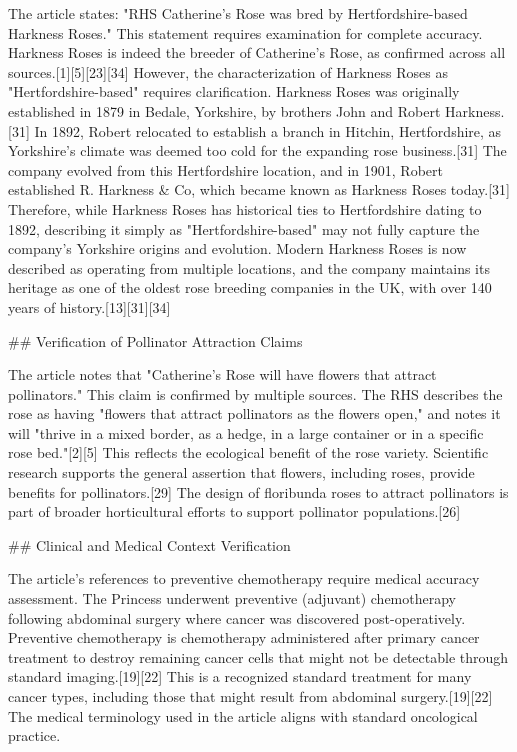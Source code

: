 \documentclass[10pt,a4paper]{article}
\begin{document}
The article states: "RHS Catherine's Rose was bred by Hertfordshire-based Harkness Roses." This statement requires examination for complete accuracy. Harkness Roses is indeed the breeder of Catherine's Rose, as confirmed across all sources.[1][5][23][34] However, the characterization of Harkness Roses as "Hertfordshire-based" requires clarification. Harkness Roses was originally established in 1879 in Bedale, Yorkshire, by brothers John and Robert Harkness.[31] In 1892, Robert relocated to establish a branch in Hitchin, Hertfordshire, as Yorkshire's climate was deemed too cold for the expanding rose business.[31] The company evolved from this Hertfordshire location, and in 1901, Robert established R. Harkness \& Co, which became known as Harkness Roses today.[31] Therefore, while Harkness Roses has historical ties to Hertfordshire dating to 1892, describing it simply as "Hertfordshire-based" may not fully capture the company's Yorkshire origins and evolution. Modern Harkness Roses is now described as operating from multiple locations, and the company maintains its heritage as one of the oldest rose breeding companies in the UK, with over 140 years of history.[13][31][34]
\par\medskip
\#\# Verification of Pollinator Attraction Claims
\par\medskip
The article notes that "Catherine's Rose will have flowers that attract pollinators." This claim is confirmed by multiple sources. The RHS describes the rose as having "flowers that attract pollinators as the flowers open," and notes it will "thrive in a mixed border, as a hedge, in a large container or in a specific rose bed."[2][5] This reflects the ecological benefit of the rose variety. Scientific research supports the general assertion that flowers, including roses, provide benefits for pollinators.[29] The design of floribunda roses to attract pollinators is part of broader horticultural efforts to support pollinator populations.[26]
\par\medskip
\#\# Clinical and Medical Context Verification
\par\medskip
The article's references to preventive chemotherapy require medical accuracy assessment. The Princess underwent preventive (adjuvant) chemotherapy following abdominal surgery where cancer was discovered post-operatively. Preventive chemotherapy is chemotherapy administered after primary cancer treatment to destroy remaining cancer cells that might not be detectable through standard imaging.[19][22] This is a recognized standard treatment for many cancer types, including those that might result from abdominal surgery.[19][22] The medical terminology used in the article aligns with standard oncological practice.
\end{document}
